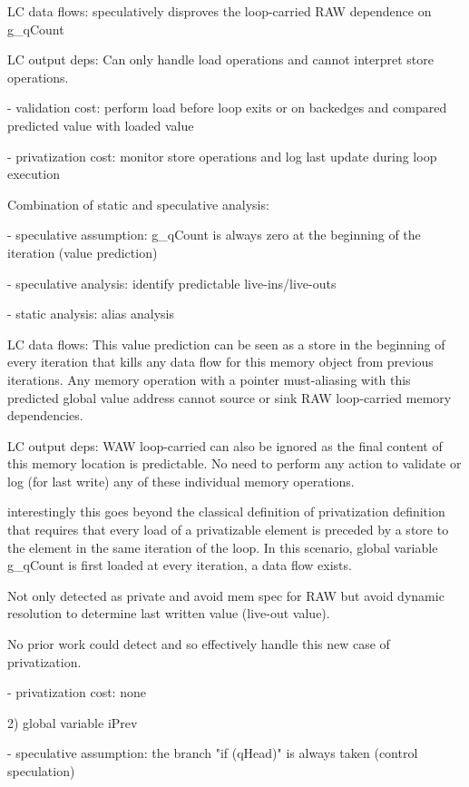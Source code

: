 LC data flows: speculatively disproves the loop-carried
RAW dependence on g\_qCount

LC output deps: Can only handle load operations and cannot interpret store
operations.

- validation cost: perform load before loop exits or on backedges and compared
  predicted value with loaded value

- privatization cost: monitor store operations and log last update during loop
  execution


Combination of static and speculative analysis:

- speculative assumption:  g\_qCount is always zero at the beginning of the
iteration (value prediction)

- speculative analysis: identify predictable live-ins/live-outs

- static analysis: alias analysis

LC data flows:
This value prediction can be seen as a store in the beginning of every
iteration that kills any data flow for this memory object from previous
iterations.  Any memory operation with a pointer must-aliasing with this
predicted global value address cannot source or sink RAW loop-carried memory
dependencies.

LC output deps: WAW loop-carried can also be ignored as the final content of this
memory location is predictable.  No need to perform any action to validate or
log (for last write) any of these individual memory operations.

interestingly this goes beyond the classical definition of privatization
definition~\cite{tu-padua-array-privatization-1994}  that requires that every
load of a privatizable element is preceded by a store to the element in the same
iteration of the loop. In this scenario, global variable g\_qCount is first
loaded at every iteration, a data flow exists.

Not only detected as private and avoid mem spec for RAW but avoid dynamic
resolution to determine last written value (live-out value).

No prior work could detect and so effectively handle this new case of
privatization.

- privatization cost: none

2) global variable iPrev

- speculative assumption: the branch "if (qHead)" is always taken (control speculation)

